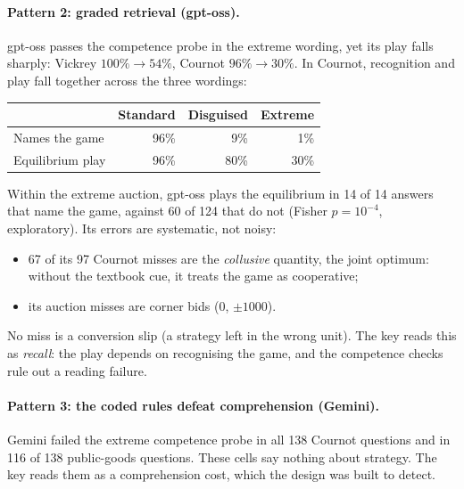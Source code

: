 \documentclass[11pt]{article}
\theoremstyle{definition}
\theoremstyle{remark}
\begin{document}
\paragraph{Pattern 2: graded retrieval (gpt-oss).} gpt-oss passes the competence probe in the
extreme wording, yet its play falls sharply: Vickrey $100\%\to54\%$, Cournot $96\%\to30\%$. In
Cournot, recognition and play fall together across the three wordings:

\begin{center}
\small
\begin{tabular}{@{}lrrr@{}}
\toprule
 & Standard & Disguised & Extreme \\
\midrule
Names the game & 96\% & 9\% & 1\% \\
Equilibrium play & 96\% & 80\% & 30\% \\
\bottomrule
\end{tabular}
\end{center}

\noindent Within the extreme auction, gpt-oss plays the equilibrium in 14 of 14 answers that
name the game, against 60 of 124 that do not (Fisher $p=10^{-4}$, exploratory). Its errors are
systematic, not noisy:
\begin{itemize}
\item 67 of its 97 Cournot misses are the \emph{collusive} quantity, the joint optimum: without
  the textbook cue, it treats the game as cooperative;
\item its auction misses are corner bids (0, $\pm1000$).
\end{itemize}
No miss is a conversion slip (a strategy left in the wrong unit). The key reads this as
\emph{recall}: the play depends on recognising the game, and the competence checks rule out a
reading failure.

\paragraph{Pattern 3: the coded rules defeat comprehension (Gemini).} Gemini failed the extreme
competence probe in all 138 Cournot questions and in 116 of 138 public-goods questions. These
cells say nothing about strategy. The key reads them as a comprehension cost, which the design
was built to detect.
\end{document}
